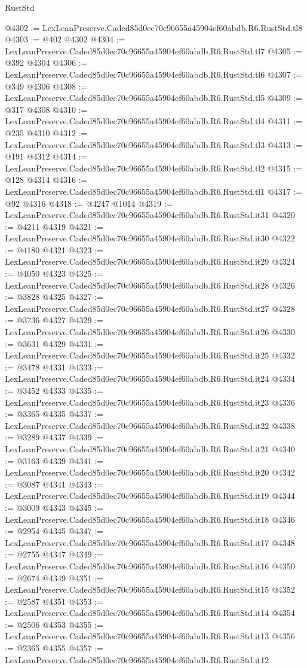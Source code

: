 \begin{lexlean}{RustStd}
\begin{coremodule}
@4302 := LexLeanPreserve.Caded85d0ec70c96655a45904ef60abdb.R6.RustStd.tl8
@4303 := @402 @4302
@4304 := LexLeanPreserve.Caded85d0ec70c96655a45904ef60abdb.R6.RustStd.tl7
@4305 := @392 @4304
@4306 := LexLeanPreserve.Caded85d0ec70c96655a45904ef60abdb.R6.RustStd.tl6
@4307 := @349 @4306
@4308 := LexLeanPreserve.Caded85d0ec70c96655a45904ef60abdb.R6.RustStd.tl5
@4309 := @317 @4308
@4310 := LexLeanPreserve.Caded85d0ec70c96655a45904ef60abdb.R6.RustStd.tl4
@4311 := @235 @4310
@4312 := LexLeanPreserve.Caded85d0ec70c96655a45904ef60abdb.R6.RustStd.tl3
@4313 := @191 @4312
@4314 := LexLeanPreserve.Caded85d0ec70c96655a45904ef60abdb.R6.RustStd.tl2
@4315 := @128 @4314
@4316 := LexLeanPreserve.Caded85d0ec70c96655a45904ef60abdb.R6.RustStd.tl1
@4317 := @92 @4316
@4318 := @4247 @1014
@4319 := LexLeanPreserve.Caded85d0ec70c96655a45904ef60abdb.R6.RustStd.it31
@4320 := @4211 @4319
@4321 := LexLeanPreserve.Caded85d0ec70c96655a45904ef60abdb.R6.RustStd.it30
@4322 := @4180 @4321
@4323 := LexLeanPreserve.Caded85d0ec70c96655a45904ef60abdb.R6.RustStd.it29
@4324 := @4050 @4323
@4325 := LexLeanPreserve.Caded85d0ec70c96655a45904ef60abdb.R6.RustStd.it28
@4326 := @3828 @4325
@4327 := LexLeanPreserve.Caded85d0ec70c96655a45904ef60abdb.R6.RustStd.it27
@4328 := @3736 @4327
@4329 := LexLeanPreserve.Caded85d0ec70c96655a45904ef60abdb.R6.RustStd.it26
@4330 := @3631 @4329
@4331 := LexLeanPreserve.Caded85d0ec70c96655a45904ef60abdb.R6.RustStd.it25
@4332 := @3478 @4331
@4333 := LexLeanPreserve.Caded85d0ec70c96655a45904ef60abdb.R6.RustStd.it24
@4334 := @3452 @4333
@4335 := LexLeanPreserve.Caded85d0ec70c96655a45904ef60abdb.R6.RustStd.it23
@4336 := @3365 @4335
@4337 := LexLeanPreserve.Caded85d0ec70c96655a45904ef60abdb.R6.RustStd.it22
@4338 := @3289 @4337
@4339 := LexLeanPreserve.Caded85d0ec70c96655a45904ef60abdb.R6.RustStd.it21
@4340 := @3163 @4339
@4341 := LexLeanPreserve.Caded85d0ec70c96655a45904ef60abdb.R6.RustStd.it20
@4342 := @3087 @4341
@4343 := LexLeanPreserve.Caded85d0ec70c96655a45904ef60abdb.R6.RustStd.it19
@4344 := @3009 @4343
@4345 := LexLeanPreserve.Caded85d0ec70c96655a45904ef60abdb.R6.RustStd.it18
@4346 := @2954 @4345
@4347 := LexLeanPreserve.Caded85d0ec70c96655a45904ef60abdb.R6.RustStd.it17
@4348 := @2755 @4347
@4349 := LexLeanPreserve.Caded85d0ec70c96655a45904ef60abdb.R6.RustStd.it16
@4350 := @2674 @4349
@4351 := LexLeanPreserve.Caded85d0ec70c96655a45904ef60abdb.R6.RustStd.it15
@4352 := @2587 @4351
@4353 := LexLeanPreserve.Caded85d0ec70c96655a45904ef60abdb.R6.RustStd.it14
@4354 := @2506 @4353
@4355 := LexLeanPreserve.Caded85d0ec70c96655a45904ef60abdb.R6.RustStd.it13
@4356 := @2365 @4355
@4357 := LexLeanPreserve.Caded85d0ec70c96655a45904ef60abdb.R6.RustStd.it12

\end{coremodule}
\end{lexlean}
